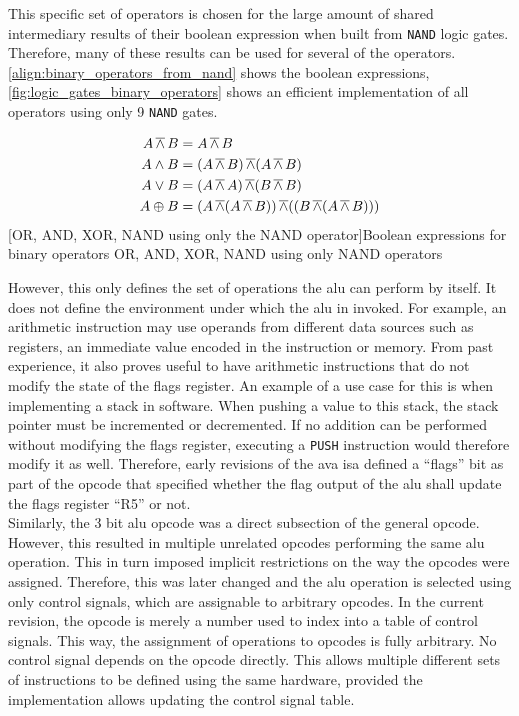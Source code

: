 This specific set of operators is chosen for the large amount of shared intermediary results of their boolean expression when built from \texttt{NAND} logic gates. Therefore, many of these results can be used for several of the operators. \autoref{align:binary_operators_from_nand} shows the boolean expressions, \autoref{fig:logic_gates_binary_operators} shows an efficient implementation of all operators using only 9 \texttt{NAND} gates.

\begin{align}
    A \mathop{\overline{\wedge}} B &= A \mathop{\overline{\wedge}} B \\
    A \wedge B  &= (A \mathop{\overline{\wedge}} B) \mathop{\overline{\wedge}} (A \mathop{\overline{\wedge}} B) \\
    A \vee B   &= (A \mathop{\overline{\wedge}} A) \mathop{\overline{\wedge}} (B \mathop{\overline{\wedge}} B) \\
    A \oplus B  &= (A \mathop{\overline{\wedge}} (A \mathop{\overline{\wedge}} B)) \mathop{\overline{\wedge}} ((B \mathop{\overline{\wedge}} (A \mathop{\overline{\wedge}} B)))
\end{align}
[OR, AND, XOR, NAND using only the NAND operator]{Boolean expressions for binary operators OR, AND, XOR, NAND using only NAND operators}
\label{align:binary_operators_from_nand}
\vspace{\baselineskip}

However, this only defines the set of operations the \ac{alu} can perform by itself. It does not define the environment under which the \ac{alu} in invoked. For example, an arithmetic instruction may use operands from different data sources such as registers, an immediate value encoded in the instruction or memory. From past experience, it also proves useful to have arithmetic instructions that do not modify the state of the flags register. An example of a use case for this is when implementing a stack in software. When pushing a value to this stack, the stack pointer must be incremented or decremented. If no addition can be performed without modifying the flags register, executing a \texttt{PUSH} instruction would therefore modify it as well. Therefore, early revisions of the \ac{ava} \ac{isa} defined a ``flags'' bit as part of the opcode that specified whether the flag output of the \ac{alu} shall update the flags register ``R5'' or not. 
\\

Similarly, the 3 bit \ac{alu} opcode was a direct subsection of the general opcode. However, this resulted in multiple unrelated opcodes performing the same \ac{alu} operation. This in turn imposed implicit restrictions on the way the opcodes were assigned. Therefore, this was later changed and the \ac{alu} operation is selected using only control signals, which are assignable to arbitrary opcodes. In the current revision, the opcode is merely a number used to index into a table of control signals. This way, the assignment of operations to opcodes is fully arbitrary. No control signal depends on the opcode directly. This allows multiple different sets of instructions to be defined using the same hardware, provided the implementation allows updating the control signal table.
\\

